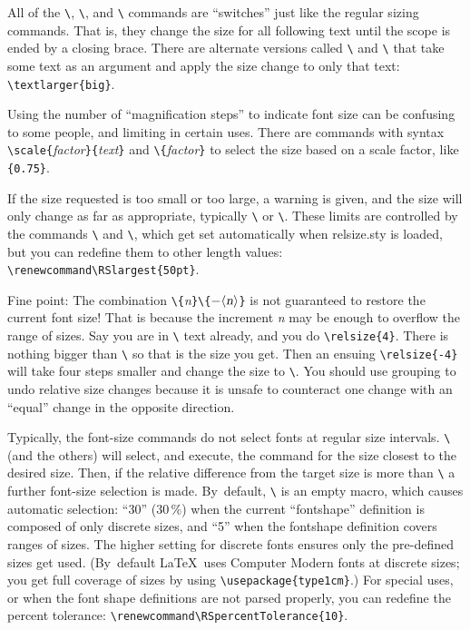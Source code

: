 \documentclass[pagesize=auto]{scrartcl}
\makeatletter
\newcommand*{\pkg}[1]{\textsf{#1}}
\newcommand*{\cs}[1]{\texttt{\textbackslash#1}}
\newcommand*{\cmd}[1]{\cs{\expandafter\@gobble\string#1}}
\newcommand*{\meta}[1]{\textlangle\textsl{#1}\textrangle}
\newcommand*{\marg}[1]{\texttt{\{}\meta{#1}\texttt{\}}}
\makeatother
\begin{document}
All of the \cmd{\relsize}, \cmd{\larger}, and \cmd{\smaller} commands are ``switches'' just
like the regular sizing commands.  That is, they change the size for all
following text until the scope is ended by a closing brace.  There are
alternate versions called \cmd{\textlarger} and \cmd{\textsmaller} that take some text
as an argument and apply the size change to only that text:
\verb+\textlarger{big}+.

Using the number of ``magnification steps'' to indicate font size can
be confusing to some people, and limiting in certain uses.  There are 
commands with syntax \cmd{\text\-scale}\marg{factor}\marg{text} and \cmd{\relscale}\marg{factor} to
select the size based on a scale factor, like \verb+{0.75}+.

If the size requested is too small or too large, a warning is given, and
the size will only change as far as appropriate, typically \cmd{\tiny} or \cmd{\Huge}.
These limits are controlled by the commands \cmd{\RSsmallest} and \cmd{\RSlargest}, which
get set automatically when \pkg{relsize.sty} is loaded, but you can redefine them
to other length values: \verb+\renewcommand\RSlargest{50pt}+.

Fine point:  The combination \cmd{\relsize}\marg{n}\cmd{\relsize}\texttt{\{}$-\text{\meta{n}}$\texttt{\}} is not guaranteed to 
restore the current font size!  That is because the increment \meta{n} may be
enough to overflow the range of sizes.  Say you are in \cmd{\huge} text already,
and you do \verb+\relsize{4}+.  There is nothing bigger than \cmd{\Huge} so that is the
size you get.  Then an ensuing \verb+\relsize{-4}+ will take four steps smaller
and change the size to \cmd{\large}.  You should use grouping to undo relative 
size changes because it is unsafe to counteract one change with an ``equal''
change in the opposite direction.

Typically, the font-size commands do not select fonts at regular size
intervals.  \cmd{\relsize} (and the others) will select, and execute, the command
for the size closest to the desired size.  Then, if the relative difference 
from the target size is more than \cmd{\RSpercentTolerance} a further font-size
selection is made.  By~default, \cmd{\RSpercentTolerance} is an empty macro, which
causes automatic selection: ``30'' (30\,\%) when the current ``fontshape'' definition
is composed of only discrete sizes, and ``5'' when the fontshape definition
covers ranges of sizes.  The higher setting for discrete fonts ensures
only the pre-defined sizes get used.  (By~default \LaTeX\ uses Computer
Modern fonts at discrete sizes; you get full coverage of sizes by using
\verb+\usepackage{type1cm}+\@.)  For special uses, or when the font shape definitions 
are not parsed properly, you can redefine the percent tolerance: 
\verb+\renewcommand\RSpercentTolerance{10}+.
\end{document}
